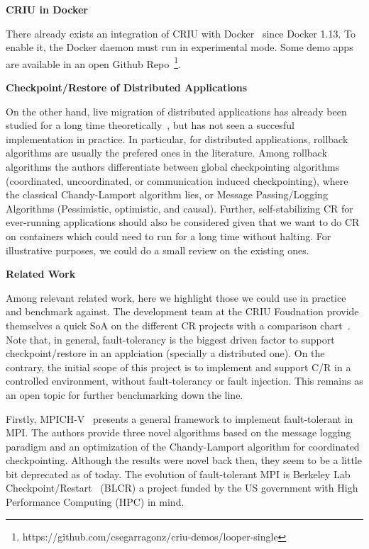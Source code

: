 \documentclass[a4paper, 10pt]{article}
\begin{document}
\textbf{CRIU in Docker}

There already exists an integration of CRIU with Docker~\cite{criu-docker} since Docker 1.13.
To enable it, the Docker daemon must run in experimental mode.
Some demo apps are available in an open Github Repo~\footnote{https://github.com/csegarragonz/criu-demos/looper-single}.

\textbf{Checkpoint/Restore of Distributed Applications}

On the other hand, live migration of distributed applications has already been studied for a long time theoretically~\cite{Raynal2013,Kshemkalyani2008}, but has not seen a succesful implementation in practice.
In particular, for distributed applications, rollback algorithms are usually the prefered ones in the literature.
Among rollback algorithms the authors differentiate between global checkpointing algorithms (coordinated, uncoordinated, or communication induced checkpointing), where the classical Chandy-Lamport algorithm lies, or Message Passing/Logging Algorithms (Pessimistic, optimistic, and causal).
Further, self-stabilizing CR for ever-running applications should also be considered given that we want to do CR on containers which could need to run for a long time without halting.
For illustrative purposes, we could do a small review on the existing ones.

\textbf{Related Work}

Among relevant related work, here we highlight those we could use in practice and benchmark against.
The development team at the CRIU Foudnation provide themselves a quick SoA on the different CR projects with a comparison chart~\cite{criu-comparison}.
Note that, in general, fault-tolerancy is the biggest driven factor to support checkpoint/restore in an applciation (specially a distributed one). 
On the contrary, the initial scope of this project is to implement and support C/R in a controlled environment, without fault-tolerancy or fault injection.
This remains as an open topic for further benchmarking down the line.


Firstly, MPICH-V~\cite{Bouteiller2006} presents a general framework to implement fault-tolerant in MPI.
The authors provide three novel algorithms based on the message logging paradigm and an optimization of the Chandy-Lamport algorithm for coordinated checkpointing.
Although the results were novel back then, they seem to be a little bit deprecated as of today.
The evolution of fault-tolerant MPI is Berkeley Lab Checkpoint/Restart~\cite{blcr} (BLCR) a project funded by the US government with High Performance Computing (HPC) in mind.
\end{document}
